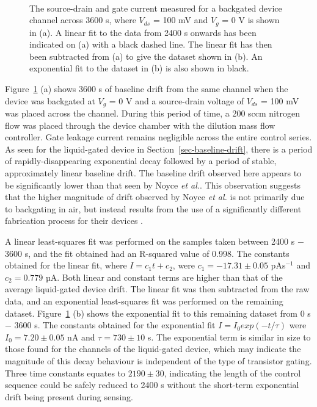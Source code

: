 \documentclass[
  a4paper,
]{scrbook}
\begin{document}
\begin{figure}
\begin{minipage}[t]{0.70\linewidth}
{{}

}

\end{minipage}%
%
\begin{minipage}[t]{0.15\linewidth}

{\centering 

~

}

\end{minipage}%

\caption{\label{fig-bg-baseline-drift}The source-drain and gate current
measured for a backgated device channel across 3600 s, where \(V_{ds}\)
= 100 mV and \(V_g\) = 0 V is shown in (a). A linear fit to the data
from 2400 s onwards has been indicated on (a) with a black dashed line.
The linear fit has then been subtracted from (a) to give the dataset
shown in (b). An exponential fit to the dataset in (b) is also shown in
black.}

\end{figure}

Figure~\ref{fig-bg-baseline-drift} (a) shows 3600 s of baseline drift
from the same channel when the device was backgated at \(V_g\) = 0 V and
a source-drain voltage of \(V_{ds}\) = 100 mV was placed across the
channel. During this period of time, a 200 sccm nitrogen flow was placed
through the device chamber with the dilution mass flow controller. Gate
leakage current remains negligible across the entire control series. As
seen for the liquid-gated device in Section~\ref{sec-baseline-drift},
there is a period of rapidly-disappearing exponential decay followed by
a period of stable, approximately linear baseline drift. The baseline
drift observed here appears to be significantly lower than that seen by
Noyce \emph{et al.}. This observation suggests that the higher magnitude
of drift observed by Noyce \emph{et al.} is not primarily due to
backgating in air, but instead results from the use of a significantly
different fabrication process for their devices \autocite{Noyce2019}.

A linear least-squares fit was performed on the samples taken between
2400 s \(-\) 3600 s, and the fit obtained had an R-squared value of
0.998. The constants obtained for the linear fit, where
\(I = c_1t + c_2\), were \(c_1 = -17.31\pm0.05\) pAs\(^{-1}\) and
\(c_2 = 0.779\) µA. Both linear and constant terms are higher than that
of the average liquid-gated device drift. The linear fit was then
subtracted from the raw data, and an exponential least-squares fit was
performed on the remaining dataset. Figure~\ref{fig-bg-baseline-drift}
(b) shows the exponential fit to this remaining dataset from 0 s \(-\)
3600 s. The constants obtained for the exponential fit
\(I = I_0exp(-t/\tau)\) were \(I_0 = 7.20 \pm 0.05\) nA and
\(\tau = 730 \pm 10\) s. The exponential term is similar in size to
those found for the channels of the liquid-gated device, which may
indicate the magnitude of this decay behaviour is independent of the
type of transistor gating. Three time constants equates to
\(2190 \pm 30\), indicating the length of the control sequence could be
safely reduced to 2400 s without the short-term exponential drift being
present during sensing.
\end{document}
